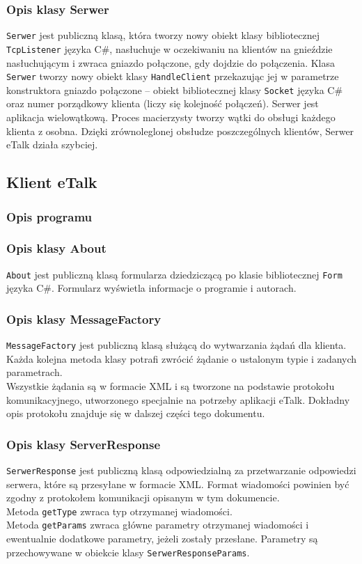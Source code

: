 \documentclass[a4paper,12pt]{article}
\begin{document}
\subsubsection[Opis klasy Serwer]{Opis klasy Serwer}
\texttt{Serwer} jest publiczną klasą, która tworzy nowy obiekt klasy bibliotecznej \texttt{TcpListener} języka C\#, nasłuchuje w oczekiwaniu na klientów na gnieździe nasłuchującym i zwraca gniazdo połączone, gdy dojdzie do połączenia.
Klasa \texttt{Serwer} tworzy nowy obiekt klasy \texttt{HandleClient} przekazując jej w parametrze konstruktora gniazdo połączone -- obiekt bibliotecznej klasy \texttt{Socket} języka C\# oraz numer porządkowy klienta (liczy się kolejność połączeń). Serwer jest aplikacja wielowątkową. Proces macierzysty tworzy wątki do obsługi każdego klienta z osobna. Dzięki zrównoleglonej obsłudze poszczególnych klientów, Serwer eTalk działa szybciej.


\subsection[Klient eTalk]{Klient eTalk}
\subsubsection[Opis programu]{Opis programu}

\subsubsection[Opis klasy About]{Opis klasy About}
\texttt{About} jest publiczną klasą formularza dziedziczącą po klasie bibliotecznej \texttt{Form}
języka C\#. Formularz wyświetla informacje o programie i autorach.

\subsubsection[Opis klasy MessageFactory]{Opis klasy MessageFactory}
\texttt{MessageFactory} jest publiczną klasą służącą do wytwarzania żądań dla klienta.\\
Każda kolejna metoda klasy potrafi zwrócić żądanie o ustalonym typie i zadanych parametrach.\\
Wszystkie żądania są w formacie XML i są tworzone na podstawie protokołu komunikacyjnego, utworzonego specjalnie na potrzeby aplikacji eTalk. Dokładny opis protokołu znajduje się w dalszej części tego dokumentu.

\subsubsection[Opis klasy ServerResponse]{Opis klasy ServerResponse}
\texttt{SerwerResponse} jest publiczną klasą odpowiedzialną za przetwarzanie odpowiedzi serwera, które są przesyłane w formacie XML.
Format wiadomości powinien być zgodny z protokołem komunikacji opisanym w tym dokumencie.\\
Metoda \texttt{getType} zwraca typ otrzymanej wiadomości.\\
Metoda \texttt{getParams} zwraca główne parametry otrzymanej wiadomości i ewentualnie dodatkowe parametry, jeżeli zostały przesłane. Parametry są przechowywane w obiekcie klasy \texttt{SerwerResponseParams}.
\end{document}
